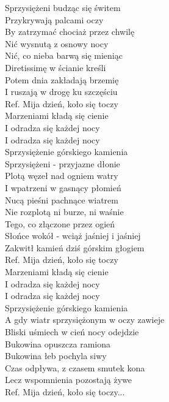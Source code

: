 
Sprzysiężeni budząc się świtem  \\
Przykrywają palcami oczy \tab{}\\
By zatrzymać chociaż przez chwilę  \\
Nić wysnutą z osnowy nocy \tab{} \\
Nić, co nieba barwą się mieniąc \\
Diretissimę w ścianie kreśli \tab{} \\
Potem dnia zakładają brzemię \tab{} \\
I ruszają w drogę ku szczęściu \tab{}\\
\hops
Ref. Mija dzień, koło się toczy \tab{}\\
 Marzeniami kładą się cienie \\
 I odradza się każdej nocy \tab{} \\
 I odradza się każdej nocy \tab{}\\
 Sprzysiężenie górskiego kamienia  \\
\hops
Sprzysiężeni - przyjazne dłonie \\
Plotą węzeł nad ogniem watry \\
I wpatrzeni w gasnący płomień \\
Nucą pieśni pachnące wiatrem \\
Nie rozplotą ni burze, ni waśnie \\
Tego, co złączone przez ogień \\
Słońce wokół - wciąż jaśniej i jaśniej \\
Zakwitł kamień dziś górskim głogiem \\
\hops
Ref. Mija dzień, koło się toczy\\
 Marzeniami kładą się cienie \\
 I odradza się każdej nocy \\
 I odradza się każdej nocy \\
 Sprzysiężenie górskiego kamienia \\
\hops
A gdy wiatr sprzysiężonym w oczy zawieje \\
Bliski uśmiech w cień nocy odejdzie \\
Bukowina opuszcza ramiona \\
Bukowina łeb pochyla siwy \\
Czas odpływa, z czasem smutek kona \\
Lecz wspomnienia pozostają żywe \\
\hops
Ref. Mija dzień, koło się toczy...
